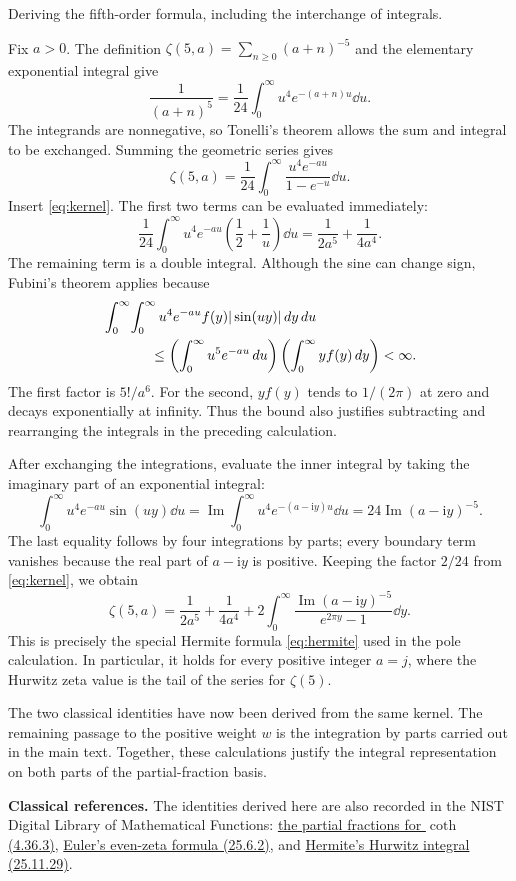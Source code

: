 \newpage
{}
{Deriving the fifth-order formula, including the interchange of integrals.}

Fix $a>0$. The definition
$\zeta(5,a)=\sum_{n\geq0}(a+n)^{-5}$ and the elementary exponential
integral give
\[
 \frac1{(a+n)^5}=\frac1{24}
       \int_0^\infty u^4e^{-(a+n)u}\dd u.
\]
The integrands are nonnegative, so Tonelli's theorem allows the sum and
integral to be exchanged. Summing the geometric series gives
\[
 \zeta(5,a)=\frac1{24}
       \int_0^\infty\frac{u^4e^{-au}}{1-e^{-u}}\dd u.
\]
Insert \eqref{eq:kernel}. The first two terms can be evaluated immediately:
\[
 \frac1{24}\int_0^\infty u^4e^{-au}
       \left(\frac12+\frac1u\right)\dd u
       =\frac1{2a^5}+\frac1{4a^4}.
\]
The remaining term is a double integral. Although the sine can change
sign, Fubini's theorem applies because
\begin{align*}
 &\int_0^\infty\!\int_0^\infty
       u^4e^{-au}f(y)|\sin(uy)|\dd y\dd u\\
 &\hspace{12mm}\leq
       \left(\int_0^\infty u^5e^{-au}\dd u\right)
       \left(\int_0^\infty yf(y)\dd y\right)<\infty.
\end{align*}
The first factor is $5!/a^6$. For the second, $yf(y)$ tends to
$1/(2\pi)$ at zero and decays exponentially at infinity. Thus the bound
also justifies subtracting and rearranging the integrals in the preceding
calculation.

After exchanging the integrations, evaluate the inner integral by taking
the imaginary part of an exponential integral:
\[
 \int_0^\infty u^4e^{-au}\sin(uy)\dd u
 =\operatorname{Im}\int_0^\infty
       u^4e^{-(a-\mathrm i y)u}\dd u
 =24\operatorname{Im}(a-\mathrm i y)^{-5}.
\]
The last equality follows by four integrations by parts; every boundary
term vanishes because the real part of $a-\mathrm i y$ is positive.
Keeping the factor $2/24$ from \eqref{eq:kernel}, we obtain
\[
 \boxed{\zeta(5,a)=\frac1{2a^5}+\frac1{4a^4}
 +2\int_0^\infty
   \frac{\operatorname{Im}(a-\mathrm i y)^{-5}}{e^{2\pi y}-1}\dd y.}
\]
This is precisely the special Hermite formula \eqref{eq:hermite} used in
the pole calculation. In particular, it holds for every positive integer
$a=j$, where the Hurwitz zeta value is the tail of the series for
$\zeta(5)$.

The two classical identities have now been derived from the same kernel.
The remaining passage to the positive weight $w$ is the integration by
parts carried out in the main text. Together, these calculations justify
the integral representation on both parts of the partial-fraction basis.

\bigskip
{\small\textbf{Classical references.}
The identities derived here are also recorded in the NIST Digital Library
of Mathematical Functions:
\href{https://dlmf.nist.gov/4.36.E3}{the partial fractions for $\coth$ (4.36.3)},
\href{https://dlmf.nist.gov/25.6.E2}{Euler's even-zeta formula (25.6.2)}, and
\href{https://dlmf.nist.gov/25.11.E29}{Hermite's Hurwitz integral (25.11.29)}.}
